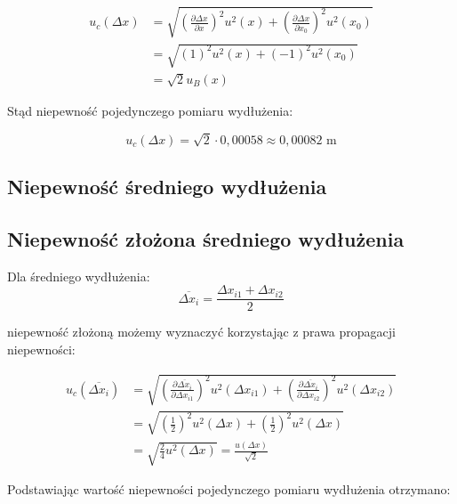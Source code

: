 \documentclass[a4paper,12pt]{article}
\begin{document}
\begin{align*}
    u_c(\Delta x) & = \sqrt{\left(\frac{\partial \Delta x}{\partial x}\right)^2 u^2(x) + \left(\frac{\partial \Delta x}{\partial x_0}\right)^2 u^2(x_0)} \\
                  & = \sqrt{(1)^2 u^2(x) + (-1)^2 u^2(x_0)}                                                                                              \\
                  & = \sqrt{2} u_B(x)
\end{align*}

Stąd niepewność pojedynczego pomiaru wydłużenia:

\begin{equation*}
    u_c(\Delta x) = \sqrt{2} \cdot 0,00058 \approx 0,00082 \text{ m}
\end{equation*}

\subsection{Niepewność średniego wydłużenia}

\subsection*{Niepewność złożona średniego wydłużenia}

Dla średniego wydłużenia:
\begin{equation*}
    \overline{\Delta x_i} = \frac{\Delta x_{i1} + \Delta x_{i2}}{2}
\end{equation*}

niepewność złożoną możemy wyznaczyć korzystając z prawa propagacji niepewności:

\begin{align*}
    u_c(\overline{\Delta x_i}) & = \sqrt{\left(\frac{\partial \overline{\Delta x_i}}{\partial \Delta x_{i1}}\right)^2 u^2(\Delta x_{i1}) + \left(\frac{\partial \overline{\Delta x_i}}{\partial \Delta x_{i2}}\right)^2 u^2(\Delta x_{i2})} \\
                               & = \sqrt{\left(\frac{1}{2}\right)^2 u^2(\Delta x) + \left(\frac{1}{2}\right)^2 u^2(\Delta x)}                                                                                                               \\
                               & = \sqrt{\frac{2}{4} u^2(\Delta x)} = \frac{u(\Delta x)}{\sqrt{2}}
\end{align*}

Podstawiając wartość niepewności pojedynczego pomiaru wydłużenia otrzymano:
\end{document}
